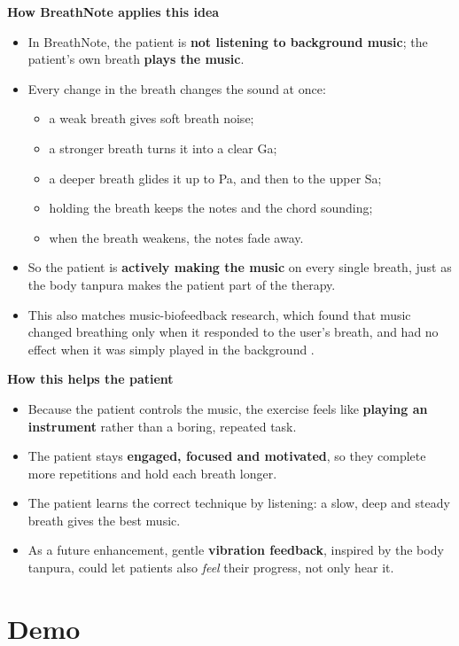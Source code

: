 \documentclass[12pt,a4paper]{article}
\begin{document}
\textbf{How BreathNote applies this idea}
\begin{itemize}
  \item In BreathNote, the patient is \textbf{not listening to background music}; the patient's own breath \textbf{plays the music}.
  \item Every change in the breath changes the sound at once:
  \begin{itemize}
    \item a weak breath gives soft breath noise;
    \item a stronger breath turns it into a clear Ga;
    \item a deeper breath glides it up to Pa, and then to the upper Sa;
    \item holding the breath keeps the notes and the chord sounding;
    \item when the breath weakens, the notes fade away.
  \end{itemize}
  \item So the patient is \textbf{actively making the music} on every single breath, just as the body tanpura makes the patient part of the therapy.
  \item This also matches music-biofeedback research, which found that music changed breathing only when it responded to the user's breath, and had no effect when it was simply played in the background \cite{bhandari}.
\end{itemize}

\textbf{How this helps the patient}
\begin{itemize}
  \item Because the patient controls the music, the exercise feels like \textbf{playing an instrument} rather than a boring, repeated task.
  \item The patient stays \textbf{engaged, focused and motivated}, so they complete more repetitions and hold each breath longer.
  \item The patient learns the correct technique by listening: a slow, deep and steady breath gives the best music.
  \item As a future enhancement, gentle \textbf{vibration feedback}, inspired by the body tanpura, could let patients also \emph{feel} their progress, not only hear it.
\end{itemize}

\section{Demo}
\label{sec:demo}
\end{document}
